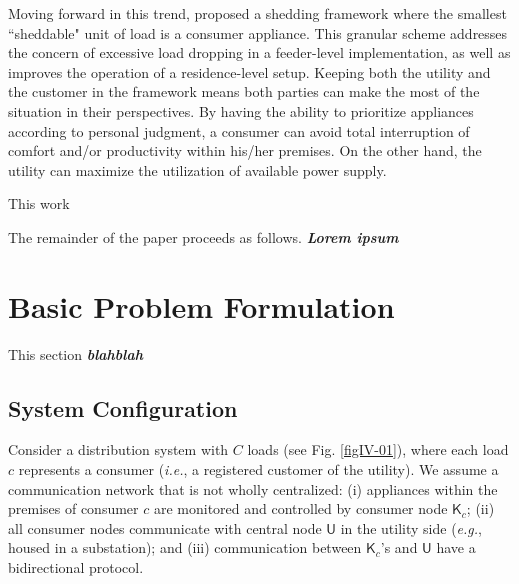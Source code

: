 \documentclass[conference, a4paper]{IEEEtran}
\begin{document}
Moving forward in this trend, \cite{Jabian2020} proposed a shedding framework where the smallest ``sheddable" unit of load is a consumer appliance.
This granular scheme addresses the concern of excessive load dropping in a feeder-level implementation,
as well as improves the operation of a residence-level setup.
Keeping both the utility and the customer in the framework means both parties can make the most of the situation in their perspectives.
By having the ability to prioritize appliances according to personal judgment, a consumer can avoid total interruption of comfort and/or productivity within his/her premises.
On the other hand, the utility can maximize the utilization of available power supply.

This work 

The remainder of the paper proceeds as follows.
\textit{\textbf{Lorem ipsum}}

\section{Basic Problem Formulation}
\label{sec: Basic Problem Formulation}

This section \textit{\textbf{blahblah}}

\subsection{System Configuration}
\label{subsec: II--System Configuration}

Consider a distribution system with $C$ loads (see Fig. \ref{figIV-01}),
where each load $c$ represents a consumer (\textit{i.e.}, a registered customer of the utility).
We assume a communication network that is not wholly centralized:
(i) appliances within the premises of consumer $c$ are monitored and controlled by consumer node $\mathsf{K}_{c}$;
(ii) all consumer nodes communicate with central node $\mathsf{U}$ in the utility side (\textit{e.g.}, housed in a substation); and
(iii) communication between $\mathsf{K}_{c}$'s and $\mathsf{U}$ have a bidirectional protocol.
\end{document}
